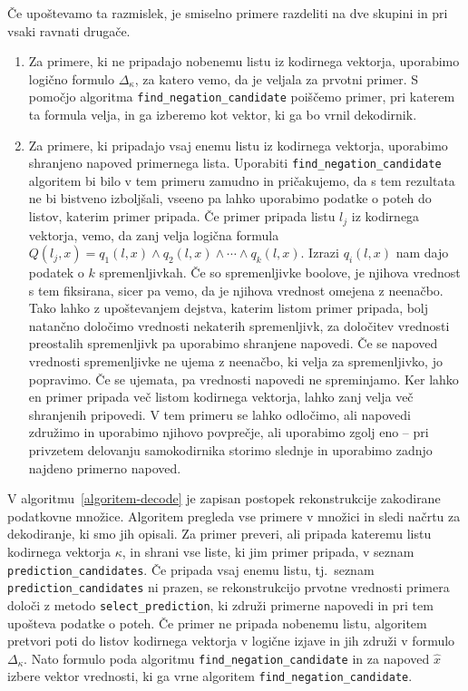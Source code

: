 \documentclass[12pt,a4paper,twoside]{article}
\theoremstyle{definition} %
\theoremstyle{plain} %
\numberwithin{equation}{section}  %
\begin{document}
Če upoštevamo ta razmislek, je smiselno primere razdeliti na dve skupini in pri vsaki ravnati drugače.
\begin{enumerate} %
	\item Za primere, ki ne pripadajo nobenemu listu iz kodirnega vektorja,
	uporabimo logično formulo $\Delta_{\kappa}$, za katero vemo, da je veljala za prvotni primer.
	S pomočjo algoritma \texttt{find\_\-negation\_\-candidate} poiščemo primer, pri katerem ta formula velja, in ga izberemo kot vektor, ki ga bo vrnil dekodirnik.

	\item Za primere, ki pripadajo vsaj enemu listu iz kodirnega vektorja, uporabimo shranjeno napoved primernega lista.
	Uporabiti \texttt{find\_\-negation\_\-candidate} algoritem bi bilo v tem primeru zamudno in pričakujemo, da s tem rezultata ne bi bistveno izboljšali, vseeno pa lahko uporabimo podatke o poteh do listov, katerim primer pripada.
	Če primer pripada listu $l_j$ iz kodirnega vektorja, vemo, da zanj velja logična formula $Q(l_j,x) = q_1(l,x) \land q_2(l,x) \land \cdots \land q_k(l,x)$.
	Izrazi $q_i(l,x)$ nam dajo podatek o $k$ spremenljivkah.
	Če so spremenljivke boolove, je njihova vrednost s tem fiksirana, sicer pa vemo, da je njihova vrednost omejena z neenačbo.
	Tako lahko z upoštevanjem dejstva, katerim listom primer pripada, bolj natančno določimo vrednosti nekaterih spremenljivk, za določitev vrednosti preostalih spremenljivk pa uporabimo shranjene napovedi.
	Če se napoved vrednosti spremenljivke ne ujema z neenačbo, ki velja za spremenljivko, jo popravimo.
	Če se ujemata, pa vrednosti napovedi ne spreminjamo.
	Ker lahko en primer pripada več listom kodirnega vektorja, lahko zanj velja več shranjenih pripovedi.
	V tem primeru se lahko odločimo, ali napovedi združimo in uporabimo njihovo povprečje, ali uporabimo zgolj eno -- pri privzetem delovanju samokodirnika storimo slednje in uporabimo zadnjo najdeno primerno napoved.
\end{enumerate}

V algoritmu~\ref{algoritem-decode} je zapisan postopek rekonstrukcije zakodirane podatkovne množice.
Algoritem pregleda vse primere v množici in sledi načrtu za dekodiranje, ki smo jih opisali.
Za primer preveri, ali pripada kateremu listu kodirnega vektorja $\kappa$, in shrani vse liste, ki jim primer pripada, v seznam \texttt{prediction\_\-candidates}.
Če pripada vsaj enemu listu, tj.~seznam \texttt{prediction\_\-candidates} ni prazen, se rekonstrukcijo prvotne vrednosti primera določi z metodo \texttt{select\_\-prediction}, ki združi primerne napovedi in pri tem upošteva podatke o poteh.
Če primer ne pripada nobenemu listu, algoritem pretvori poti do listov kodirnega vektorja v logične izjave in jih združi v formulo $\Delta_{\kappa}$.
Nato formulo poda algoritmu \texttt{find\_\-negation\_\-candidate} in za napoved $\hat{x}$ izbere vektor vrednosti, ki ga vrne algoritem \texttt{find\_\-negation\_\-candidate}.
\end{document}
